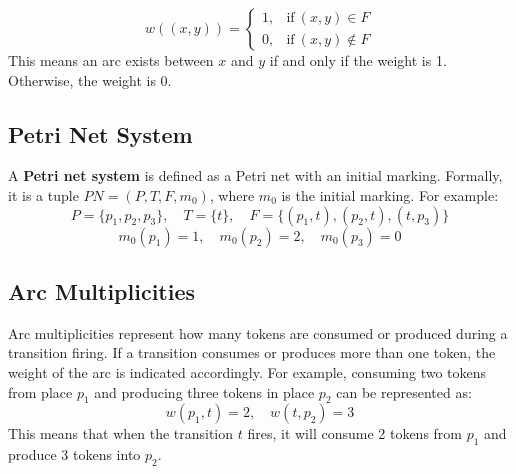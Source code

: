     \[
    w((x, y)) = 
    \begin{cases}
    1, & \text{if} \ (x, y) \in F \\
    0, & \text{if} \ (x, y) \notin F
    \end{cases}
    \]
    This means an arc exists between \(x\) and \(y\) if and only if the weight is 1. Otherwise, the weight is 0.
    
    \subsection{Petri Net System}
    
    A \textbf{Petri net system} is defined as a Petri net with an initial marking. Formally, it is a tuple \(PN = (P, T, F, m_0)\), where \(m_0\) is the initial marking. For example:
    \[
    P = \{p_1, p_2, p_3\}, \quad T = \{t\}, \quad F = \{(p_1, t), (p_2, t), (t, p_3)\}
    \]
    \[
    m_0(p_1) = 1, \quad m_0(p_2) = 2, \quad m_0(p_3) = 0
    \]
    
    \subsection{Arc Multiplicities}
    
    Arc multiplicities represent how many tokens are consumed or produced during a transition firing. If a transition consumes or produces more than one token, the weight of the arc is indicated accordingly. For example, consuming two tokens from place \(p_1\) and producing three tokens in place \(p_2\) can be represented as:
    \[
    w(p_1, t) = 2, \quad w(t, p_2) = 3
    \]
    This means that when the transition \(t\) fires, it will consume 2 tokens from \(p_1\) and produce 3 tokens into \(p_2\).